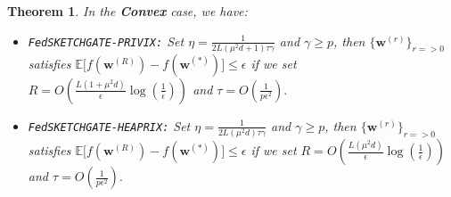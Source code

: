\documentclass[twoside]{article}
\newtheorem{theorem}{Theorem}
\begin{document}
\begin{theorem}
In the \textbf{Convex} case, we have:  
     \begin{itemize}
         \item \texttt{FedSKETCHGATE-PRIVIX:} Set  $\eta=\frac{1}{2L\left(\mu^2d+1\right)\tau\gamma}$ and $\gamma\geq p$, then $\{ {\boldsymbol{w}}^{(r)}\}_{r=>0}$ satisfies $ \mathbb{E}\Big[f({\boldsymbol{w}}^{(R)})-f({\boldsymbol{w}}^{(*)})\Big]\leq \epsilon$ if we set
     $R=O\left(\frac{L\left(1+\mu^2d\right)}{\epsilon}\log\left(\frac{1}{\epsilon}\right)\right)$ and $ \tau=O\left(\frac{1}{p\epsilon^2}\right).$
         \item \texttt{FedSKETCHGATE-HEAPRIX:} Set $\eta=\frac{1}{2L\left(\mu^2d\right)\tau\gamma}$ and $\gamma\geq p$, then $\{ {\boldsymbol{w}}^{(r)}\}_{r=>0}$ satisfies $ \mathbb{E}\Big[f({\boldsymbol{w}}^{(R)})-f({\boldsymbol{w}}^{(*)})\Big]\leq \epsilon$ if we set
     $R=O\left(\frac{L\left(\mu^2d\right)}{\epsilon}\log\left(\frac{1}{\epsilon}\right)\right)$ and $ \tau=O\left(\frac{1}{p\epsilon^2}\right).$ 
     \end{itemize}
\end{theorem}
\end{document}
